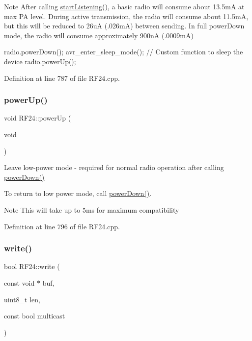 \begin{DoxyNote}{Note}
After calling \hyperlink{classRF24_a30a2733a3889bdc331fe2d2f4f0f7b39}{start\+Listening()}, a basic radio will consume about 13.\+5mA at max PA level. During active transmission, the radio will consume about 11.\+5mA, but this will be reduced to 26uA (.026mA) between sending. In full power\+Down mode, the radio will consume approximately 900nA (.0009mA)
\end{DoxyNote}

\begin{DoxyCode}
radio.powerDown();
avr\_enter\_sleep\_mode(); \textcolor{comment}{// Custom function to sleep the device}
radio.powerUp();
\end{DoxyCode}
 

Definition at line 787 of file R\+F24.\+cpp.

\mbox{\label{classRF24_a5cdaf47aa0edd6dca1b9a8bb7972a1a3}} 
\subsubsection{\texorpdfstring{power\+Up()}{powerUp()}}
{\footnotesize\ttfamily void R\+F24\+::power\+Up (\begin{DoxyParamCaption}\item[{void}]{ }\end{DoxyParamCaption})}

Leave low-\/power mode -\/ required for normal radio operation after calling \hyperlink{classRF24_aa0a51923a09ba4f3478aba9be0f8a6a1}{power\+Down()}

To return to low power mode, call \hyperlink{classRF24_aa0a51923a09ba4f3478aba9be0f8a6a1}{power\+Down()}. \begin{DoxyNote}{Note}
This will take up to 5ms for maximum compatibility 
\end{DoxyNote}


Definition at line 796 of file R\+F24.\+cpp.

\mbox{\label{classRF24_a23bfe6502d74bb5bbccb3a7f2ba2b5ea}} 
\subsubsection{\texorpdfstring{write()}{write()}\hspace{0.1cm}{\footnotesize\ttfamily [2/2]}}
{\footnotesize\ttfamily bool R\+F24\+::write (\begin{DoxyParamCaption}\item[{const void $\ast$}]{buf,  }\item[{uint8\+\_\+t}]{len,  }\item[{const bool}]{multicast }\end{DoxyParamCaption})}

